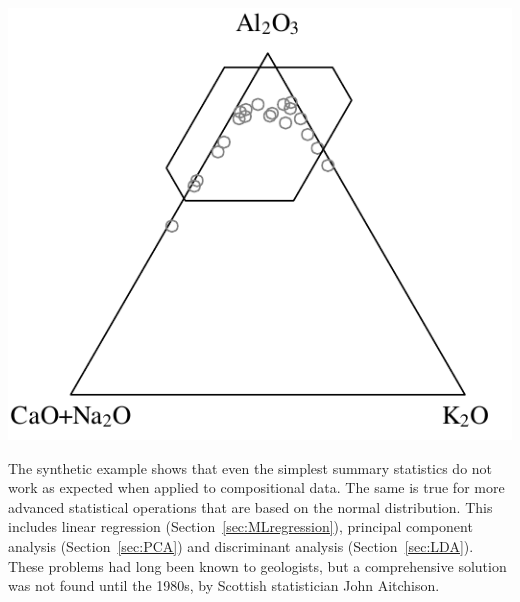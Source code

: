 \noindent\begin{minipage}[t][][b]{.4\textwidth}
\includegraphics[width=\textwidth]{../figures/ACNKnaive.pdf}\\
\end{minipage}
\begin{minipage}[t][][t]{.6\textwidth}
  \label{fig:ACNKnaive}
\end{minipage}

The synthetic example shows that even the simplest summary statistics
do not work as expected when applied to compositional data.  The same
is true for more advanced statistical operations that are based on the
normal distribution. This includes linear regression
(Section~\ref{sec:MLregression}), principal component analysis
(Section~\ref{sec:PCA}) and discriminant analysis
(Section~\ref{sec:LDA}). These problems had long been known to
geologists, but a comprehensive solution was not found until the
1980s, by Scottish statistician John Aitchison.\\


